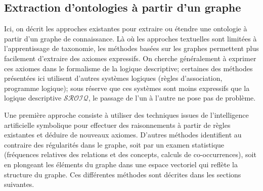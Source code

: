\subsection{Extraction d'ontologies à partir d'un graphe}
\label{subsec:litt-te-graph}



Ici, on décrit les approches existantes pour extraire ou étendre une ontologie à partir d'un graphe de connaissance. Là où les approches textuelles sont limitées à l'apprentissage de taxonomie, les méthodes basées sur les graphes permettent plus facilement d'extraire des axiomes expressifs. On cherche généralement à exprimer ces axiomes dans le formalisme de la logique descriptive; certaines des méthodes présentées ici utilisent d'autres systèmes logiques (règles d'association, programme logique); sous réserve que ces systèmes sont moins expressifs que la logique descriptive $\mathcal{SROIQ}$, le passage de l'un à l'autre ne pose pas de problème.

Une première approche consiste à utiliser des techniques issues de l'intelligence artificielle symbolique pour effectuer des raisonnements à partir de règles existantes et déduire de nouveaux axiomes. D'autres méthodes identifient au contraire des régularités dans le graphe, soit par un examen statistique (fréquences relatives des relations et des concepts, calculs de co-occurrences), soit en plongeant les éléments du graphe dans une espace vectoriel qui reflète la structure du graphe. Ces différentes méthodes sont décrites dans les sections suivantes.


